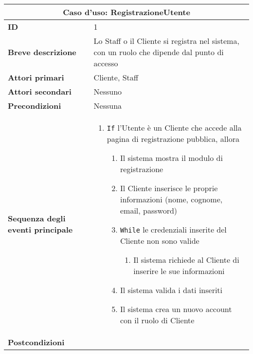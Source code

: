 \documentclass[a4paper]{report}
\begin{document}
\clearpage
\begin{table}[H]
\vspace*{-0cm}
\renewcommand{\arraystretch}{1.9}
\begin{tabular}{|p{3.9cm}|p{9.9cm}|}
\hline
\multicolumn{2}{|c|}{\textbf{Caso d’uso: RegistrazioneUtente}} \\ \hline
\textbf{ID} & 1 \\ \hline
\textbf{Breve descrizione} & Lo Staff o il Cliente si registra nel sistema, con un ruolo che dipende dal punto di accesso \\ \hline
\textbf{Attori primari} & Cliente, Staff \\ \hline
\textbf{Attori secondari} & Nessuno \\ \hline
\textbf{Precondizioni} & Nessuna \\ \hline
\textbf{Sequenza degli eventi principale} &
\begin{enumerate}[leftmargin=14pt,label=\arabic*.,labelsep=0.5em,topsep=0pt,partopsep=0pt,parsep=0pt,itemsep=0pt]
    \item \texttt{If} l'Utente è un Cliente che accede alla pagina di registrazione pubblica, allora
    \begin{enumerate}[label=\arabic{enumi}.\arabic*.,leftmargin=22pt,labelsep=0.5em,topsep=0pt,partopsep=0pt,parsep=0pt,itemsep=0pt]
        \item Il sistema mostra il modulo di registrazione
        \item Il Cliente inserisce le proprie informazioni (nome, cognome, email, password)
        \item \texttt{While} le credenziali inserite del Cliente non sono valide
        \begin{enumerate}[label=\arabic{enumi}.\arabic*.,leftmargin=22pt,labelsep=0.5em,topsep=0pt,partopsep=0pt,parsep=0pt,itemsep=0pt]
        \item Il sistema richiede al Cliente di inserire le sue informazioni
    \end{enumerate}
        \item Il sistema valida i dati inseriti
        \item Il sistema crea un nuovo account con il ruolo di Cliente
    \end{enumerate}
\end{enumerate}\\ \hline
\textbf{Postcondizioni} & 
\begin{enumerate}[leftmargin=14pt,label=\arabic*.,labelsep=0.5em,topsep=0pt,partopsep=0pt,parsep=0pt,itemsep=0pt]

\end{enumerate}
\end{tabular}
\end{table}
\end{document}

